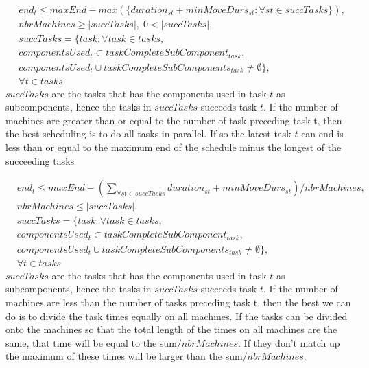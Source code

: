\documentclass[10pt,a4paper]{report}
\begin{document}
\begin{equation}\label{eq:72}
\begin{aligned}
&end_t \le maxEnd - max(\{duration_{st} + minMoveDurs_{st} : \forall st \in succTasks\}), \\
&nbrMachines \ge |succTasks|, \; 0 < |succTasks|, \\
&succTasks = \{task : \forall task \in tasks,\\
&componentsUsed_t \subset taskCompleteSubComponent_{task}, \\
&componentsUsed_t \cup taskCompleteSubComponents_{task} \neq \emptyset\}, \\
&\forall t \in tasks
\end{aligned}
\end{equation}
$succTasks$ are the tasks that has the components used in task $t$ as subcomponents, hence the tasks in $succTasks$ succeeds task $t$. If the number of machines are greater than or equal to the number of task preceding task t, then the best scheduling is to do all tasks in parallel. If so the latest task $t$ can end is less than or equal to the maximum end of the schedule minus the longest of the succeeding tasks

\begin{equation}\label{eq:73}
\begin{aligned}
&end_t \le maxEnd - \left(\sum_{\forall st \in succTasks}duration_{st} + minMoveDurs_{st}\right) / nbrMachines, \\
&nbrMachines \le |succTasks|, \\
&succTasks = \{task : \forall task \in tasks, \\
&componentsUsed_t \subset taskCompleteSubComponent_{task}, \\
&componentsUsed_t \cup taskCompleteSubComponents_{task} \neq \emptyset\}, \\
&\forall t \in tasks
\end{aligned}
\end{equation}
$succTasks$ are the tasks that has the components used in task $t$ as subcomponents, hence the tasks in $succTasks$ succeeds task $t$. If the number of machines are less than the number of tasks preceding task t, then the best we can do is to divide the task times equally on all machines. If the tasks can be divided onto the machines so that the total length of the times on all machines are the same, that time will be equal to the sum$/nbrMachines$. If they don't match up the maximum of these times will be larger than the sum$/nbrMachines$.
\end{document}
